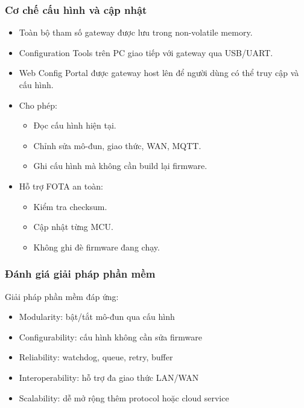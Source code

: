         \subsubsection{Cơ chế cấu hình và cập nhật}
            \begin{itemize}
                \item Toàn bộ tham số gateway được lưu trong non-volatile memory.
                \item Configuration Tools trên PC giao tiếp với gateway qua USB/UART.
                \item Web Config Portal được gateway host lên để người dùng có thể truy cập và cấu hình.
                \item Cho phép:
                \begin{itemize}
                    \item Đọc cấu hình hiện tại.
                    \item Chỉnh sửa mô-đun, giao thức, WAN, MQTT.
                    \item Ghi cấu hình mà không cần build lại firmware.
                \end{itemize}
                \item Hỗ trợ FOTA an toàn:
                \begin{itemize}
                    \item Kiểm tra checksum.
                    \item Cập nhật từng MCU.
                    \item Không ghi đè firmware đang chạy.
                \end{itemize}
            \end{itemize}

        \subsubsection{Đánh giá giải pháp phần mềm}
            Giải pháp phần mềm đáp ứng:
            \begin{itemize}
                \item Modularity: bật/tắt mô-đun qua cấu hình
                \item Configurability: cấu hình không cần sửa firmware
                \item Reliability: watchdog, queue, retry, buffer
                \item Interoperability: hỗ trợ đa giao thức LAN/WAN
                \item Scalability: dễ mở rộng thêm protocol hoặc cloud service
            \end{itemize}
